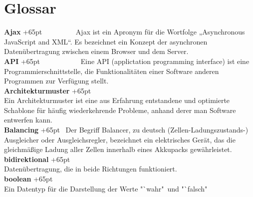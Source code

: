 \documentclass[fontsize = 12pt, paper = a4]{scrreprt}
\begin{document}








\chapter*{Glossar}



\textbf{Ajax}
\hangindent+65pt 
\ \ \ \ \ \ \ \ \ Ajax ist ein Apronym für die Wortfolge „Asynchronous JavaScript and XML“. Es bezeichnet ein Konzept der asynchronen Datenübertragung zwischen einem Browser und dem Server.\\

\textbf{API}
\hangindent+65pt 
\ \ \ \ \ \ \ \ \ \ \ Eine API (applictation programming interface) ist eine Programmierschnitt\-stelle, die Funktionalitäten einer Software anderen Programmen zur Verfügung stellt.\\

\textbf{Architekturmuster}
\hangindent+65pt  \\
Ein Architekturmuster ist eine aus Erfahrung entstandene und optimierte Schablone für häufig wiederkehrende Probleme, anhand derer man Software entwerfen kann.\\

\textbf{Balancing}
\hangindent+65pt 
\ Der Begriff Balancer, zu deutsch (Zellen-Ladungszustands-) Ausgleicher oder Ausgleichsregler, bezeichnet ein elektrisches Gerät, das die gleichmäßige Ladung aller Zellen innerhalb eines Akkupacks gewährleistet.\\

\textbf{bidirektional}
\hangindent+65pt  \\
Datenübertragung, die in beide Richtungen funktioniert. \\

\textbf{boolean}
\hangindent+65pt  \\
Ein Datentyp für die Darstellung der Werte "`wahr"\ und "`falsch"\.\\
\end{document}
